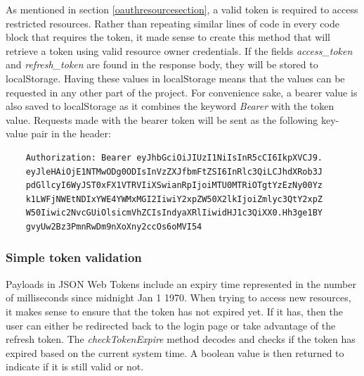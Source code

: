 As mentioned in section \ref{oauthresourcesection}, a valid token is required to access restricted resources.
Rather than repeating similar lines of code in every code block that requires the token, it made sense to create this method that will
retrieve a token using valid resource owner credentials.
If the fields \textit{access\_token} and \textit{refresh\_token} are found in the response body, they will be stored to localStorage.
Having these values in localStorage means that the values can be requested in any other part of the project.
For convenience sake, a bearer value is also saved to localStorage as it combines the keyword \textit{Bearer} with the token value.
Requests made with the bearer token will be sent as the following key-value pair in the header:

\begin{verbatim}
    Authorization: Bearer eyJhbGciOiJIUzI1NiIsInR5cCI6IkpXVCJ9.
    eyJleHAiOjE1NTMwODg0ODIsInVzZXJfbmFtZSI6InRlc3QiLCJhdXRob3J
    pdGllcyI6WyJST0xFX1VTRVIiXSwianRpIjoiMTU0MTRiOTgtYzEzNy00Yz
    k1LWFjNWEtNDIxYWE4YWMxMGI2IiwiY2xpZW50X2lkIjoiZmlyc3QtY2xpZ
    W50Iiwic2NvcGUiOlsicmVhZCIsIndyaXRlIiwidHJ1c3QiXX0.Hh3ge1BY
    gvyUw2Bz3PmnRwDm9nXoXny2ccOs6oMVI54
\end{verbatim}


\subsubsection*{Simple token validation}
Payloads in JSON Web Tokens include an expiry time represented in the number of milliseconds since midnight Jan 1 1970.
When trying to access new resources, it makes sense to ensure that the token has not expired yet.
If it has, then the user can either be redirected back to the login page or take advantage of the refresh token.
The \textit{checkTokenExpire} method decodes and checks if the token has expired based on the current system time.
A boolean value is then returned to indicate if it is still valid or not.

\clearpage
